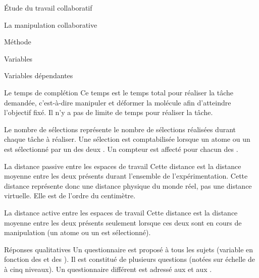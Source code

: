 \documentclass[myfrancais]{mythesis}
\begin{document}
\begin{mypart}{Étude du travail collaboratif}
\begin{mychapter}{La manipulation collaborative}
\begin{mysection}{Méthode}
\begin{mysubsection}{Variables}
\begin{mysubsubsection}{Variables dépendantes}
						\begin{myparagraph}{ Le temps de complétion}
							Ce temps est le temps total pour réaliser la tâche demandée, c'est-à-dire manipuler et déformer la molécule afin d'atteindre l'objectif fixé.
							Il n'y a pas de limite de temps pour réaliser la tâche.
						\end{myparagraph}
						\begin{myparagraph}{ Le nombre de sélections}
							 représente le nombre de sélections réalisées durant chaque tâche à réaliser.
							Une sélection est comptabilisée lorsque un atome ou un  est sélectionné par un des deux .
							Un compteur est affecté pour chacun des .
						\end{myparagraph}
						\begin{myparagraph}{ La distance passive entre les espaces de travail}
							Cette distance est la distance moyenne entre les deux  présents durant l'ensemble de l'expérimentation.
							Cette distance représente donc une distance physique du monde réel, pas une distance virtuelle.
							Elle est de l'ordre du centimètre.
						\end{myparagraph}
						\begin{myparagraph}{ La distance active entre les espaces de travail}
							Cette distance est la distance moyenne entre les deux  présents seulement lorsque ces deux  sont en cours de manipulation (un atome ou un  est sélectionné).
						\end{myparagraph}
						\begin{myparagraph}{ Réponses qualitatives}
							Un questionnaire est proposé à tous les sujets (variable en fonction des  et des ).
							Il est constitué de plusieurs questions (notées sur échelle de  à cinq niveaux).
							Un questionnaire différent est adressé aux  et aux .


\end{myparagraph}
\end{mysubsubsection}
\end{mysubsection}
\end{mysection}
\end{mychapter}
\end{mypart}
\end{document}
